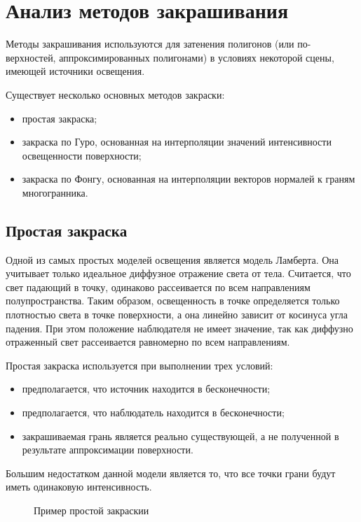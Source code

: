 \section{Анализ методов закрашивания}

Методы закрашивания используются для затенения полигонов (или по-
верхностей, аппроксимированных полигонами) в условиях некоторой сцены, имеющей источники освещения.

Существует несколько основных методов закраски:
\begin{itemize}
	\item простая закраска;
	\item закраска по Гуро, основанная на интерполяции значений интенсивности освещенности поверхности;
	\item закраска по Фонгу, основанная на интерполяции векторов нормалей к граням многогранника.
\end{itemize}

\subsection{Простая закраска}

Одной из самых простых моделей освещения является модель Ламберта. Она учитывает только идеальное диффузное отражение света от тела. Считается, что свет падающий в точку, одинаково рассеивается по всем направлениям полупространства. Таким образом, освещенность в точке определяется только плотностью света в точке поверхности, а она линейно зависит от косинуса угла падения. При этом положение наблюдателя не имеет значение, так как диффузно отраженный свет рассеивается равномерно по всем направлениям.

Простая закраска используется при выполнении трех условий:
\begin{itemize}
	\item предполагается, что источник находится в бесконечности;
	\item предполагается, что наблюдатель находится в бесконечности;
	\item закрашиваемая грань является реально существующей, а не полученной в результате аппроксимации поверхности.
\end{itemize}

Большим недостатком данной модели является то, что все точки грани будут иметь одинаковую интенсивность.

\begin{figure}[ph!]
	\caption{Пример простой закраскии}
	\label{fig:draw_simple}
\end{figure}

